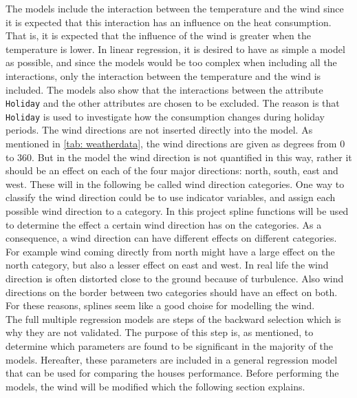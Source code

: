 The models include the interaction between the temperature and the wind since it is expected that this interaction has an influence on the heat consumption. That is, it is expected that the influence of the wind is greater when the temperature is lower. In linear regression, it is desired to have as simple a model as possible, and since the models would be too complex when including all the interactions, only the interaction between the temperature and the wind is included.
\noindent The models also show that the interactions between the attribute \texttt{Holiday} and the other attributes are chosen to be excluded. The reason is that \texttt{Holiday} is used to investigate how the consumption changes during holiday periods. The wind directions are not inserted directly into the model. As mentioned in \cref{tab: weatherdata}, the wind directions are given as degrees from $0$ to $360$. But in the model the wind direction is not quantified in this way, rather it should be an effect on each of the four major directions: north, south, east and west. These will in the following be called wind direction categories. One way to classify the wind direction could be to use indicator variables, and assign each possible wind direction to a category. In this project spline functions will be used to determine the effect a certain wind direction has on the categories. As a consequence, a wind direction can have different effects on different categories. For example wind coming directly from north might have a large effect on the north category, but also a lesser effect on east and west. In real life the wind direction is often distorted close to the ground because of turbulence. Also wind directions on the border between two categories should have an effect on both. For these reasons, splines seem like a good choise for modelling the wind. \\

\noindent The full multiple regression models are steps of the backward selection which is why they are not validated. The purpose of this step is, as mentioned, to determine which parameters are found to be significant in the majority of the models. Hereafter, these parameters are included in a general regression model that can be used for comparing the houses performance. Before performing the models, the wind will be modified which the following section explains.

